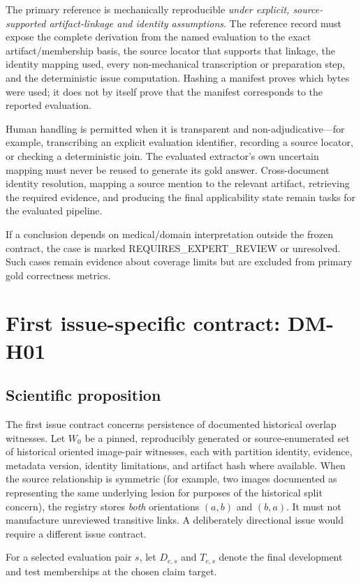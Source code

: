 \documentclass[11pt,a4paper]{article}
\newcommand{\status}[1]{\textsf{\small #1}}
\begin{document}
The primary reference is mechanically reproducible \emph{under explicit, source-supported artifact-linkage and identity assumptions}. The reference record must expose the complete derivation from the named evaluation to the exact artifact/membership basis, the source locator that supports that linkage, the identity mapping used, every non-mechanical transcription or preparation step, and the deterministic issue computation. Hashing a manifest proves which bytes were used; it does not by itself prove that the manifest corresponds to the reported evaluation.

Human handling is permitted when it is transparent and non-adjudicative---for example, transcribing an explicit evaluation identifier, recording a source locator, or checking a deterministic join. The evaluated extractor's own uncertain mapping must never be reused to generate its gold answer. Cross-document identity resolution, mapping a source mention to the relevant artifact, retrieving the required evidence, and producing the final applicability state remain tasks for the evaluated pipeline.

If a conclusion depends on medical/domain interpretation outside the frozen contract, the case is marked \status{REQUIRES\_EXPERT\_REVIEW} or unresolved. Such cases remain evidence about coverage limits but are excluded from primary gold correctness metrics.

\section{First issue-specific contract: DM-H01}
\label{sec:dmh01}
\subsection{Scientific proposition}
The first issue contract concerns persistence of documented historical overlap witnesses. Let $W_0$ be a pinned, reproducibly generated or source-enumerated set of historical oriented image-pair witnesses, each with partition identity, evidence, metadata version, identity limitations, and artifact hash where available. When the source relationship is symmetric (for example, two images documented as representing the same underlying lesion for purposes of the historical split concern), the registry stores \emph{both} orientations $(a,b)$ and $(b,a)$. It must not manufacture unreviewed transitive links. A deliberately directional issue would require a different issue contract.

For a selected evaluation pair $s$, let $D_{e,s}$ and $T_{e,s}$ denote the final development and test memberships at the chosen claim target.
\end{document}
